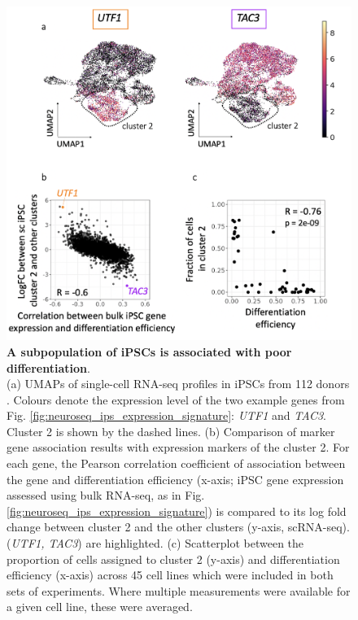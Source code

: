 \begin{figure}[htbp]
\centering
\includegraphics[width=14cm]{Chapter5/Fig/neuroseq_ips_sc_genes.png}
\caption[An iPSC subpopulation is linked to poor differentiation]{\textbf{A subpopulation of iPSCs is associated with poor differentiation}.\\
(a) UMAPs of single-cell RNA-seq profiles in iPSCs from 112 donors \cite{cuomo2020single}.
Colours denote the expression level of the two example genes from Fig. \ref{fig:neuroseq_ips_expression_signature}: \textit{UTF1} and \textit{TAC3}. 
Cluster 2 is shown by the dashed lines. 
(b) Comparison of marker gene association results with expression markers of the cluster 2. For each gene, the Pearson correlation coefficient of association between the gene and differentiation efficiency (x-axis; iPSC gene expression assessed using bulk RNA-seq, as in Fig. \ref{fig:neuroseq_ips_expression_signature}) is compared to its log fold change between cluster 2 and the other clusters (y-axis, scRNA-seq).
(\textit{UTF1, TAC3}) are highlighted. 
(c) Scatterplot between the proportion of cells assigned to cluster 2 (y-axis) and differentiation efficiency (x-axis) across 45 cell lines which were included in both sets of experiments. 
Where multiple measurements were available for a given cell line, these were averaged.}
\label{fig:neuroseq_ips_sc_genes}
\end{figure}

